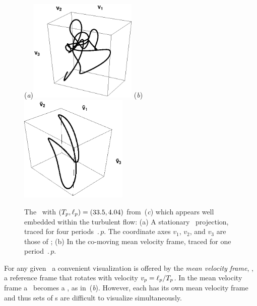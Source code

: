 \begin{figure}[t]
\begin{center}
(\textit{a})\includegraphics[width=0.46\textwidth]{figs/ks22rpo033.50_04.045E2.eps}
(\textit{b})\includegraphics[width=0.46\textwidth]{figs/ks22rpo033.50_04.045E2CM.eps}
\\
\end{center}
\caption{
 The
\rpo\ with $({T_{p}},\ell_p) =(33.5,4.04)$
from \,(\textit{c})
which appears well embedded within the turbulent flow:
 (a) A stationary \statesp\ projection,
  traced for four periods $\period{p}$. The coordinate axes
$v_1$, $v_2$, and $v_3$ are those of ;
 (b) In the co-moving mean velocity frame,
 traced for one period $\period{p}$.
        } \label{f:MeanVelocityFrame}
\end{figure}

For any given \rpo\ a convenient visualization is
offered by the {\em mean velocity frame}, {\ie},
a reference frame that rotates with velocity
$v_p=\ell_p/{T_{p}}$.
In the mean velocity frame a \rpo\ becomes
a \po, as in \,(\textit{b}).
However, each {\rpo} has its own mean velocity frame and thus
sets of \rpo s are difficult to visualize simultaneously.

